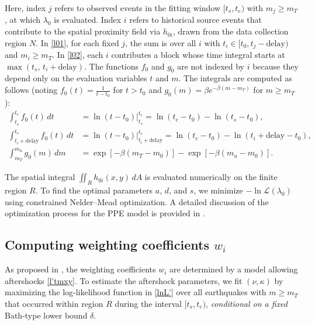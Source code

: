 \documentclass[extra,mreferee]{gji}
\theoremstyle{lemma}
\begin{document}
\noindent Here, index $j$ refers to observed events in the fitting window $[t_s, t_e)$ with $m_j \ge m_T$, at which $\lambda_0$ is evaluated. Index $i$ refers to historical source events that contribute to the spatial proximity field via $h_{0i}$, drawn from the data collection region $N$. In \eqref{l01}, for each fixed $j$, the sum is over all $i$ with $t_i \in [t_0, t_j - \mathrm{delay})$ and $m_i \ge m_T$. In \eqref{l02}, each $i$ contributes a block whose time integral starts at $\max(t_s,\, t_i + \mathrm{delay})$. The functions $f_0$ and $g_0$ are not indexed by $i$ because they depend only on the evaluation variables $t$ and $m$. The integrals are computed as follows (noting $f_0(t) = \frac{1}{t - t_0}$ for $t > t_0$ and $g_0(m) = \beta e^{-\beta(m - m_T)}$ for $m \ge m_T$):
\begin{equation}
\begin{aligned}
\int_{t_s}^{t_e} f_0(t)\, dt &= \ln(t - t_0)\bigg|_{t_s}^{t_e} 
= \ln(t_e - t_0) - \ln(t_s - t_0), \\
\int_{t_i + \mathrm{delay}}^{t_e} f_0(t)\, dt 
&= \ln(t - t_0)\bigg|_{t_i + \mathrm{delay}}^{t_e} 
= \ln(t_e - t_0) - \ln(t_i + \mathrm{delay} - t_0), \\
\int_{m_T}^{m_u} g_0(m)\, dm 
&= \exp[-\beta(m_T - m_0)] - \exp[-\beta(m_u - m_0)].
\end{aligned}
\end{equation}

The spatial integral $\iint_R h_{0i}(x,y)\, dA$ is evaluated numerically on the finite region $R$. To find the optimal parameters $a$, $d$, and $s$, we minimize $-\ln \mathcal{L}(\lambda_0)$ using constrained Nelder–Mead optimization. A detailed discussion of the optimization process for the PPE model is provided in .


\subsection{Computing weighting coefficients \texorpdfstring{$w_i$}{wi}}
As proposed in \cite{RE}, the weighting coefficients $w_i$ are determined by a model allowing aftershocks \eqref{l'tmxy}.
To estimate the aftershock parameters, we fit $(\nu, \kappa)$ by maximizing the log-likelihood function in \eqref{lnL'} over all earthquakes with $m \ge m_T$ that occurred within region $R$ during the interval $[t_s, t_e)$, \emph{conditional on a fixed} Bath-type lower bound $\delta$.
\end{document}
